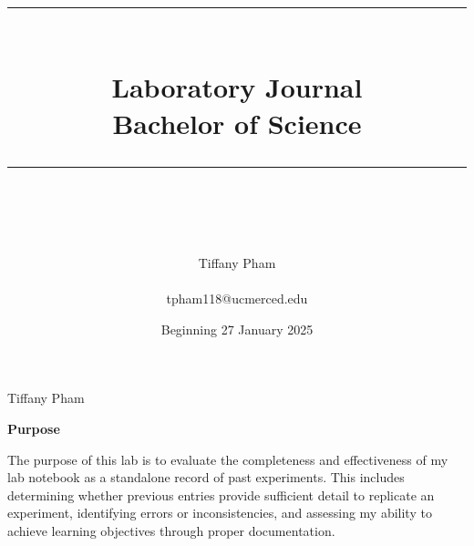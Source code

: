 \documentclass[idxtotoc,hyperref,openany]{labbook} %
\newcommand{\HRule}{\rule{\linewidth}{0.5mm}} %
\begin{document}

\frontmatter %
\title{
\begin{center}
\HRule \\[0.4cm]
{\Huge \bfseries Laboratory Journal \\[0.5cm] \Large Bachelor of Science}\\[0.4cm] %
\HRule \\[1.5cm]
\end{center}
}
\author{\Huge Tiffany Pham \\ \\ \LARGE tpham118@ucmerced.edu \\[2cm]} %
\date{Beginning 27 January 2025} %
\maketitle

\tableofcontents

\mainmatter %










\vspace{-5mm}
Tiffany Pham

\textbf{Purpose}

The purpose of this lab is to evaluate the completeness and effectiveness of my lab notebook as a standalone record of past experiments. This includes determining whether previous entries provide sufficient detail to replicate an experiment, identifying errors or inconsistencies, and assessing my ability to achieve learning objectives through proper documentation.
\end{document}
